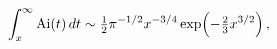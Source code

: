 \[\int_{x}^{\infty}\mathop{\mathrm{Ai}\/}\nolimits\!\left(t\right)dt\sim\tfrac{1%
}{2}\pi^{-1/2}x^{-3/4}\mathop{\exp\/}\nolimits\!\left({-}\tfrac{2}{3}x^{3/2}%
\right),\]